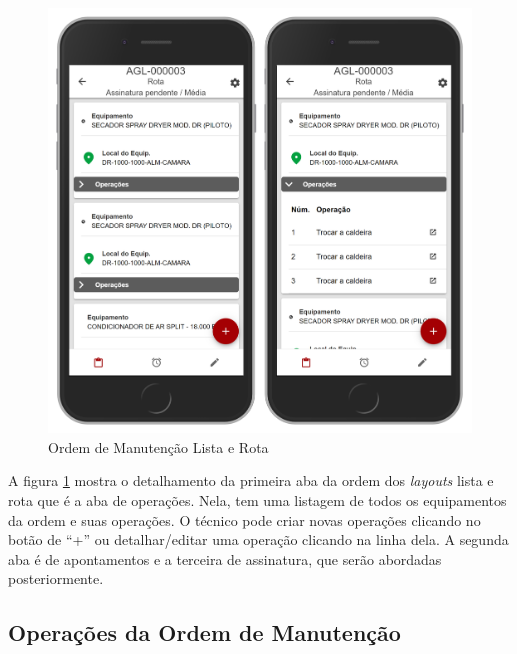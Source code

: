 \begin{figure}[H]
	\caption{\label{mobile-om-rota}Ordem de Manutenção Lista e Rota}
	\begin{center}
		\includegraphics[scale=0.55]{./Figuras/agil.it/mobile-om-rota.jpg}
	\end{center}
\end{figure}

A figura \ref{mobile-om-rota} mostra o detalhamento da primeira aba da ordem dos \textit{layouts} lista e rota que é a aba de operações. Nela, tem uma listagem de todos os equipamentos da ordem e suas operações. O técnico pode criar novas operações clicando no botão de ``+'' ou detalhar/editar uma operação clicando na linha dela.
A segunda aba é de apontamentos e a terceira de assinatura, que serão abordadas posteriormente.

\subsection{Operações da Ordem de Manutenção}

